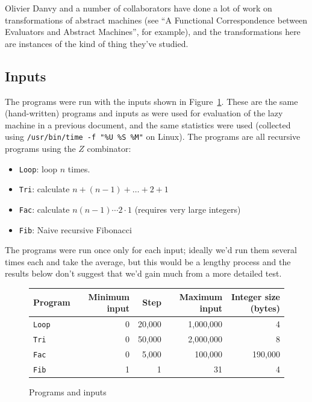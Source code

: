\documentclass[a4paper]{article}
\begin{document}
\noindent Olivier Danvy and a number of collaborators have done a lot
of work on transformations of abstract machines (see ``A Functional
Correspondence between Evaluators and Abstract Machines'', for
example), and the transformations here are instances of the kind of
thing they've studied.
\\

\subsection*{Inputs}
The programs were run with the inputs shown in
Figure~\ref{fig:benchmark-inputs}. These are the same (hand-written)
programs and inputs as were used for evaluation of the lazy machine in
a previous document, and the same statistics were used (collected using
\texttt{/usr/bin/time -f "\%U \%S \%M"} on Linux). The programs are all
recursive programs using the $Z$ combinator:

\begin{itemize}
\item \texttt{Loop}: loop $n$ times.
\item \texttt{Tri}: calculate $n + (n-1) + \ldots + 2 + 1$
\item \texttt{Fac}: calculate $n(n-1)\cdots2\cdot1$ (requires very large integers)
\item \texttt{Fib}: Naive recursive Fibonacci
  \end{itemize}




The programs were
run once only for each input;  ideally we'd run them several times
each and take the average, but this would be a lengthy process and
the results below don't suggest that we'd gain much from a more detailed
test.

\begin{figure}[H]
\centering
\begin{tabular}{|l|r|r|r|r|} 
\hline
Program   & Minimum input & Step & Maximum input & Integer size (bytes) \\
\hline
\texttt{Loop} & 0 & 20,000 & 1,000,000 & 4\\
\texttt{Tri}  & 0 & 50,000 & 2,000,000 & 8\\
\texttt{Fac}  & 0 & 5,000 & 100,000 & 190,000\\
\texttt{Fib}  & 1 & 1 & 31 & 4 \\
\hline
\end{tabular}
\caption{Programs and inputs}\label{fig:benchmark-inputs}
\end{figure}
\end{document}
